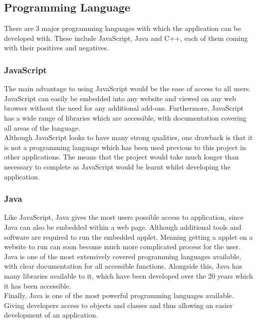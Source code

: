 \subsection{Programming Language}
There are 3 major programming languages with which the application can be developed with. These include JavaScript, Java and C++, each of them coming with their positives and negatives.
\subsubsection{JavaScript}
The main advantage to using JavaScript would be the ease of access to all users. JavaScript can easily be embedded into any website and viewed on any web browser without the need for any additional add-ons. Furthermore, JavaScript has a wide range of libraries which are accessible, with documentation covering all areas of the language.
\vspace{5 mm}\\
Although JavaScript looks to have many strong qualities, one drawback is that it is not a programming language which has been used previous to this project in other applications. The means that the project would take much longer than necessary to complete as JavaScript would be learnt whilst developing the application.
\subsubsection{Java}
Like JavaScript, Java gives the most users possible access to application, since Java can also be embedded within a web page. Although additional tools and software are required to run the embedded applet. Meaning getting a applet on a website to run can soon become much more complicated process for the user.
\vspace{5 mm}\\
Java is one of the most extensively covered programming languages available, with clear documentation for all accessible functions. Alongside this, Java has many libraries available to it, which have been developed over the 20 years which it has been accessible.
\vspace{5 mm}\\
Finally, Java is one of the most powerful programming languages available. Giving developers access to objects and classes and thus allowing an easier development of an application.

